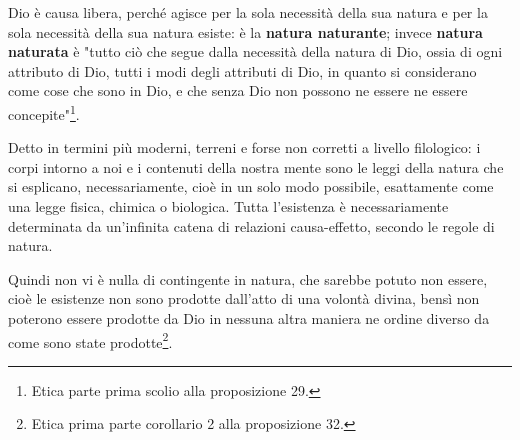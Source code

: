 Dio è causa libera, perché agisce per la sola necessità della sua natura e per la sola necessità della sua natura esiste: è la \textbf{natura naturante}; invece \textbf{natura naturata} è "tutto ciò che segue dalla necessità della natura di Dio, ossia di ogni attributo di Dio, tutti i modi degli attributi di Dio, in quanto si considerano come cose che sono in Dio, e che senza Dio non possono ne essere ne essere concepite"\footnote{Etica parte prima scolio alla proposizione 29.}.

Detto in termini più moderni, terreni e forse non corretti a livello filologico: i corpi intorno a noi e i contenuti della nostra mente sono le leggi della natura che si esplicano, necessariamente, cioè in un solo modo possibile, esattamente come una legge fisica, chimica o biologica. Tutta l'esistenza è necessariamente determinata da un'infinita catena di relazioni causa-effetto, secondo le regole di natura. 

Quindi non vi è nulla di contingente in natura, che sarebbe potuto non essere, cioè le esistenze non sono prodotte dall'atto di una volontà divina, bensì non poterono essere prodotte da Dio in nessuna altra maniera ne ordine diverso da come sono state prodotte\footnote{Etica prima parte corollario 2 alla proposizione 32.}.



